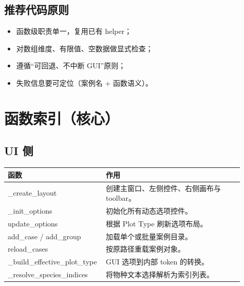 \documentclass[11pt,a4paper]{ctexart}
\begin{document}
\subsection{推荐代码原则}
\begin{itemize}
  \item 函数级职责单一，复用已有 helper；
  \item 对数组维度、有限值、空数据做显式检查；
  \item 遵循“可回退、不中断 GUI”原则；
  \item 失败信息要可定位（案例名 + 函数语义）。
\end{itemize}

\section{函数索引（核心）}
\subsection{UI 侧}
\begin{longtable}{>{\ttfamily}p{0.33\linewidth} p{0.58\linewidth}}
\toprule
函数 & 作用 \\
\midrule
\endhead
\_create\_layout & 创建主窗口、左侧控件、右侧画布与 toolbar。 \\
\_init\_options & 初始化所有动态选项控件。 \\
update\_options & 根据 Plot Type 刷新选项布局。 \\
add\_case / add\_group & 加载单个或批量案例目录。 \\
reload\_cases & 按原路径重载案例对象。 \\
\_build\_effective\_plot\_type & GUI 选项到内部 token 的转换。 \\
\_resolve\_species\_indices & 将物种文本选择解析为索引列表。 \\
\bottomrule
\end{longtable}
\end{document}
